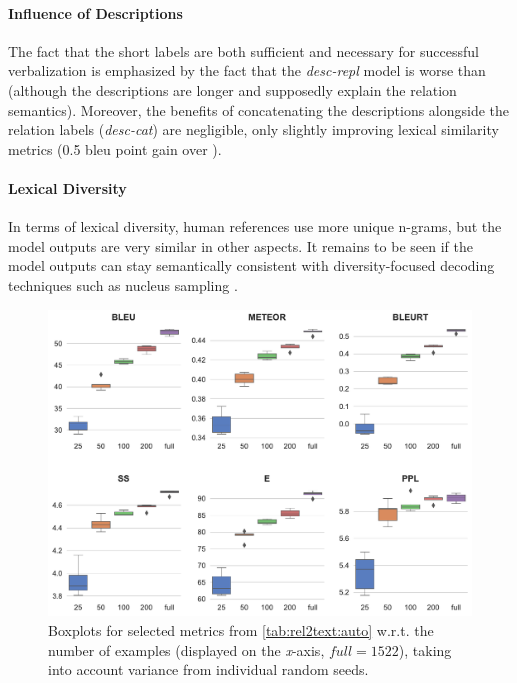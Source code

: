 \paragraph{Influence of Descriptions} The fact that the short labels are both sufficient and necessary for successful verbalization is emphasized by the fact that the \textit{desc-repl} model is worse than \BARTr{} (although the descriptions are longer and supposedly explain the relation semantics). Moreover, the benefits of concatenating the descriptions alongside the relation labels (\textit{desc-cat}) are negligible, only slightly improving lexical similarity metrics (0.5 \acs{bleu} point gain over \BARTr{}).

\paragraph{Lexical Diversity} In terms of lexical diversity, human references use more unique n-grams, but the model outputs are very similar in other aspects. It remains to be seen if the model outputs can stay semantically consistent with diversity-focused decoding techniques such as nucleus sampling \cite{holtzman2019curious}.

\begin{figure}[t]
    \centering
    \includegraphics[width=\textwidth]{img/rel2text-fewshot.pdf}
    \caption{Boxplots for selected metrics from \autoref{tab:rel2text:auto} w.r.t. the number of examples (displayed on the \textit{x}-axis, $\textit{full} = 1522$), taking into account variance from individual random seeds.}\label{fig:rel2text:fewshot}
\end{figure}

